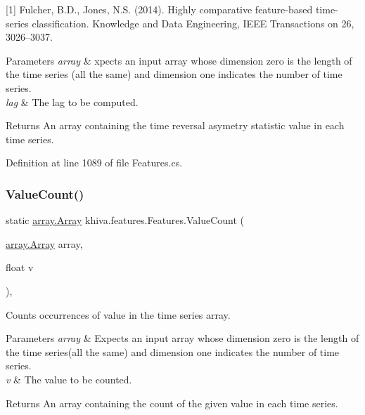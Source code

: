 \mbox{[}1\mbox{]} Fulcher, B.\+D., Jones, N.\+S. (2014). Highly comparative feature-\/based time-\/series classification. Knowledge and Data Engineering, I\+E\+EE Transactions on 26, 3026–3037. 


\begin{DoxyParams}{Parameters}
{\em array} & xpects an input array whose dimension zero is the length of the time series (all the same) and dimension one indicates the number of time series.\\
\hline
{\em lag} & The lag to be computed.\\
\hline
\end{DoxyParams}
\begin{DoxyReturn}{Returns}
An array containing the time reversal asymetry statistic value in each time series.
\end{DoxyReturn}


Definition at line 1089 of file Features.\+cs.

\mbox{\label{classkhiva_1_1features_1_1_features_ad5c7c9e151ece61006ae5d7102cbaac0}} 
\subsubsection{\texorpdfstring{Value\+Count()}{ValueCount()}}
{\footnotesize\ttfamily static \mbox{\hyperlink{classkhiva_1_1array_1_1_array}{array.\+Array}} khiva.\+features.\+Features.\+Value\+Count (\begin{DoxyParamCaption}\item[{\mbox{\hyperlink{classkhiva_1_1array_1_1_array}{array.\+Array}}}]{array,  }\item[{float}]{v }\end{DoxyParamCaption})\hspace{0.3cm}{\ttfamily [inline]}, {\ttfamily [static]}}



Counts occurrences of value in the time series array. 


\begin{DoxyParams}{Parameters}
{\em array} & Expects an input array whose dimension zero is the length of the time series(all the same) and dimension one indicates the number of time series.\\
\hline
{\em v} & The value to be counted.\\
\hline
\end{DoxyParams}
\begin{DoxyReturn}{Returns}
An array containing the count of the given value in each time series.
\end{DoxyReturn}



